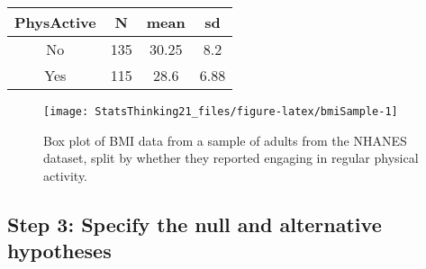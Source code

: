 \documentclass[]{book}
\theoremstyle{definition}
\theoremstyle{definition}
\theoremstyle{definition}
\theoremstyle{remark}
\begin{document}
\begin{longtable}[]{@{}cccc@{}}
\toprule
\begin{minipage}[b]{0.16\columnwidth}\centering\strut
PhysActive\strut
\end{minipage} & \begin{minipage}[b]{0.07\columnwidth}\centering\strut
N\strut
\end{minipage} & \begin{minipage}[b]{0.10\columnwidth}\centering\strut
mean\strut
\end{minipage} & \begin{minipage}[b]{0.10\columnwidth}\centering\strut
sd\strut
\end{minipage}\tabularnewline
\midrule
\endhead
\begin{minipage}[t]{0.16\columnwidth}\centering\strut
No\strut
\end{minipage} & \begin{minipage}[t]{0.07\columnwidth}\centering\strut
135\strut
\end{minipage} & \begin{minipage}[t]{0.10\columnwidth}\centering\strut
30.25\strut
\end{minipage} & \begin{minipage}[t]{0.10\columnwidth}\centering\strut
8.2\strut
\end{minipage}\tabularnewline
\begin{minipage}[t]{0.16\columnwidth}\centering\strut
Yes\strut
\end{minipage} & \begin{minipage}[t]{0.07\columnwidth}\centering\strut
115\strut
\end{minipage} & \begin{minipage}[t]{0.10\columnwidth}\centering\strut
28.6\strut
\end{minipage} & \begin{minipage}[t]{0.10\columnwidth}\centering\strut
6.88\strut
\end{minipage}\tabularnewline
\bottomrule
\end{longtable}

\begin{figure}
\texttt{[image: StatsThinking21\_files/figure-latex/bmiSample-1]} \caption{Box plot of BMI data from a sample of adults from the NHANES dataset, split by whether they reported engaging in regular physical activity.}\label{fig:bmiSample}
\end{figure}

\subsection{Step 3: Specify the null and alternative
hypotheses}\label{step-3-specify-the-null-and-alternative-hypotheses}
\end{document}
